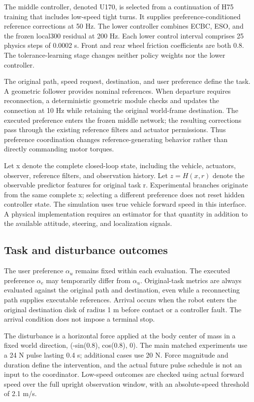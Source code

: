 \documentclass[journal]{IEEEtran}
\begin{document}
The middle controller, denoted U170, is selected from a continuation of H75 training that includes low-speed tight turns. It supplies preference-conditioned reference corrections at 50 Hz. The lower controller combines ECBC, ESO, and the frozen local300 residual at 200 Hz. Each lower control interval comprises 25 physics steps of 0.0002 s. Front and rear wheel friction coefficients are both 0.8. The tolerance-learning stage changes neither policy weights nor the lower controller.


The original path, speed request, destination, and user preference define the task. A geometric follower provides nominal references. When departure requires reconnection, a deterministic geometric module checks and updates the connection at 10 Hz while retaining the original world-frame destination. The executed preference enters the frozen middle network; the resulting corrections pass through the existing reference filters and actuator permissions. Thus preference coordination changes reference-generating behavior rather than directly commanding motor torques.


Let x denote the complete closed-loop state, including the vehicle, actuators, observer, reference filters, and observation history. Let $z=H(x,r)$ denote the observable predictor features for original task r. Experimental branches originate from the same complete x; selecting a different preference does not reset hidden controller state. The simulation uses true vehicle forward speed in this interface. A physical implementation requires an estimator for that quantity in addition to the available attitude, steering, and localization signals.


\subsection{Task and disturbance outcomes}

The user preference $\alpha_u$ remains fixed within each evaluation. The executed preference $\alpha_e$ may temporarily differ from $\alpha_u$. Original-task metrics are always evaluated against the original path and destination, even while a reconnecting path supplies executable references. Arrival occurs when the robot enters the original destination disk of radius 1 m before contact or a controller fault. The arrival condition does not impose a terminal stop.


The disturbance is a horizontal force applied at the body center of mass in a fixed world direction, (-sin(0.8), cos(0.8), 0). The main matched experiments use a 24 N pulse lasting 0.4 s; additional cases use 20 N. Force magnitude and duration define the intervention, and the actual future pulse schedule is not an input to the coordinator. Low-speed outcomes are checked using actual forward speed over the full upright observation window, with an absolute-speed threshold of 2.1 m/s.
\end{document}
